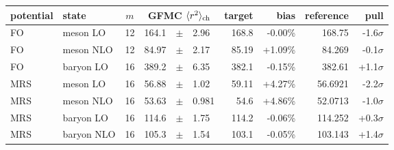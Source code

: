 \begin{tabular}{llcr@{\,}c@{\,}lrrrr}
\hline\hline
potential & state & $m$ & \multicolumn{3}{c}{GFMC $\langle r^2\rangle_{\rm ch}$} & target & bias & reference & pull \\
\hline
FO & meson LO & 12 & 164.1 & $\pm$ & 2.96 & 168.8 & -0.00\% & 168.75 & -1.6$\sigma$ \\
FO & meson NLO & 12 & 84.97 & $\pm$ & 2.17 & 85.19 & +1.09\% & 84.269 & -0.1$\sigma$ \\
FO & baryon LO & 16 & 389.2 & $\pm$ & 6.35 & 382.1 & -0.15\% & 382.61 & +1.1$\sigma$ \\
MRS & meson LO & 16 & 56.88 & $\pm$ & 1.02 & 59.11 & +4.27\% & 56.6921 & -2.2$\sigma$ \\
MRS & meson NLO & 16 & 53.63 & $\pm$ & 0.981 & 54.6 & +4.86\% & 52.0713 & -1.0$\sigma$ \\
MRS & baryon LO & 16 & 114.6 & $\pm$ & 1.75 & 114.2 & -0.06\% & 114.252 & +0.3$\sigma$ \\
MRS & baryon NLO & 16 & 105.3 & $\pm$ & 1.54 & 103.1 & -0.05\% & 103.143 & +1.4$\sigma$ \\
\hline\hline
\end{tabular}
